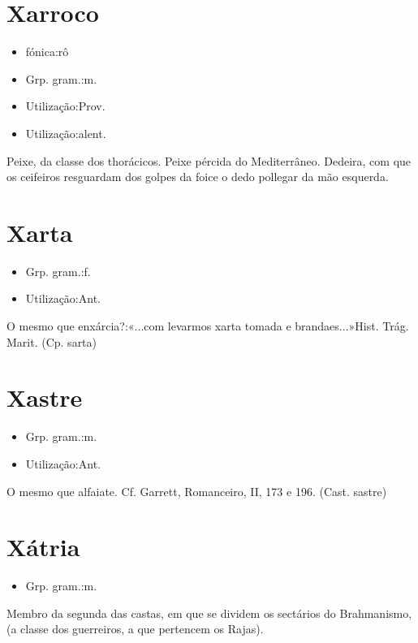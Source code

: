 \section{Xarroco}
\begin{itemize}
\item {fónica:rô}
\end{itemize}
\begin{itemize}
\item {Grp. gram.:m.}
\end{itemize}
\begin{itemize}
\item {Utilização:Prov.}
\end{itemize}
\begin{itemize}
\item {Utilização:alent.}
\end{itemize}
Peixe, da classe dos thorácicos.
Peixe pércida do Mediterrâneo.
Dedeira, com que os ceifeiros resguardam dos golpes da foice o dedo pollegar da mão esquerda.
\section{Xarta}
\begin{itemize}
\item {Grp. gram.:f.}
\end{itemize}
\begin{itemize}
\item {Utilização:Ant.}
\end{itemize}
O mesmo que \textunderscore enxárcia\textunderscore ?:«\textunderscore ...com levarmos xarta tomada e brandaes...\textunderscore »\textunderscore Hist. Trág. Marit.\textunderscore 
(Cp. \textunderscore sarta\textunderscore )
\section{Xastre}
\begin{itemize}
\item {Grp. gram.:m.}
\end{itemize}
\begin{itemize}
\item {Utilização:Ant.}
\end{itemize}
O mesmo que \textunderscore alfaiate\textunderscore . Cf. Garrett, \textunderscore Romanceiro\textunderscore , II, 173 e 196.
(Cast. \textunderscore sastre\textunderscore )
\section{Xátria}
\begin{itemize}
\item {Grp. gram.:m.}
\end{itemize}
Membro da segunda das castas, em que se dividem os sectários do Brahmanismo, (a classe dos guerreiros, a que pertencem os Rajas).
